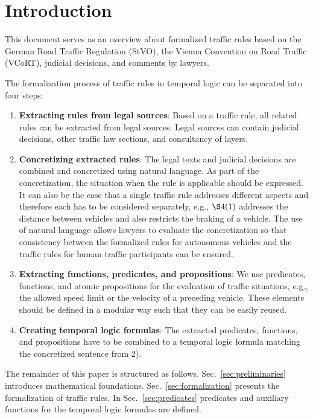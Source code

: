
\section{Introduction}
This document serves as an overview about formalized traffic rules based on the German Road Traffic
Regulation (StVO), the Vienna Convention on Road Traffic \cite{vienna_convention} (VCoRT), judicial decisions, and comments by lawyers. 

The formalization process of traffic rules in temporal logic can be separated into four steps:
\begin{enumerate}
	\item \textbf{Extracting rules from legal sources}: Based on a traffic rule, all related rules can be extracted from legal sources. Legal sources can contain judicial decisions, other traffic law sections, and consultancy of layers.  
	
	\item \textbf{Concretizing extracted rules}: The legal texts and judicial decisions are combined and concretized using natural language. As part of the concretization, the situation when the rule is applicable should be expressed. It can also be the case that a single traffic rule addresses different aspects and therefore each has to be considered separately, e.g., \stvo$\S 4(1)$ addresses the distance between vehicles and also restricts the braking of a vehicle. The use of natural language allows lawyers to evaluate the concretization so that consistency between the formalized rules for autonomous vehicles and the traffic rules for human traffic participants can be ensured.
	
	\item \textbf{Extracting functions, predicates, and propositions}: 
	We use predicates, functions, and atomic propositions for the evaluation of traffic situations, e.g., the allowed speed limit or the velocity of a preceding vehicle. These elements should be defined in a modular way such that they can be easily reused.
	
	\item \textbf{Creating temporal logic formulas}: The extracted predicates, functions, and propositions have to be combined to a temporal logic formula matching the concretized sentence from 2).
\end{enumerate}

The remainder of this paper is structured as follows. Sec.~\ref{sec:preliminaries} introduces mathematical foundations. Sec.~\ref{sec:formalization} presents the formalization of traffic rules. In Sec.~\ref{sec:predicates} predicates and auxiliary functions for the temporal logic formulas are defined.